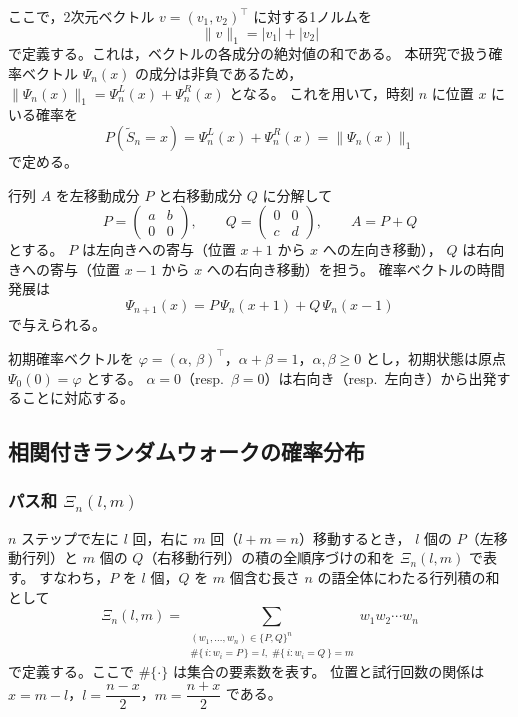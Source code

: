 \documentclass[a4j,dvipdfmx]{jsarticle}
\theoremstyle{plainnote}
\begin{document}
ここで，2次元ベクトル $v = (v_1, v_2)^\top$ に対する1ノルムを
\begin{equation}
  \|v\|_1 = |v_1| + |v_2|
  \label{eq:l1_norm}
\end{equation}
で定義する。これは，ベクトルの各成分の絶対値の和である。
本研究で扱う確率ベクトル $\Psi_n(x)$ の成分は非負であるため，
$\|\Psi_n(x)\|_1 = \Psi_n^L(x) + \Psi_n^R(x)$ となる。
これを用いて，時刻 $n$ に位置 $x$ にいる確率を
\[
  P(\tilde{S}_n = x) = \Psi_n^L(x) + \Psi_n^R(x) = \|\Psi_n(x)\|_1
\]
で定める。

行列 $A$ を左移動成分 $P$ と右移動成分 $Q$ に分解して
\[
  P = \begin{pmatrix} a & b \\ 0 & 0 \end{pmatrix}, \qquad
  Q = \begin{pmatrix} 0 & 0 \\ c & d \end{pmatrix}, \qquad
  A = P + Q
\]
とする。
$P$ は左向きへの寄与（位置 $x+1$ から $x$ への左向き移動），
$Q$ は右向きへの寄与（位置 $x-1$ から $x$ への右向き移動）を担う。
確率ベクトルの時間発展は
\begin{equation}
  \Psi_{n+1}(x) = P\,\Psi_n(x+1) + Q\,\Psi_n(x-1)
  \label{eq:crw_evolution}
\end{equation}
で与えられる。

初期確率ベクトルを
$\varphi = (\alpha,\,\beta)^\top$，$\alpha + \beta = 1$，$\alpha,\beta \geq 0$
とし，初期状態は原点 $\Psi_0(0) = \varphi$ とする。
$\alpha = 0$（resp.\ $\beta = 0$）は右向き（resp.\ 左向き）から出発することに対応する。

\subsection{相関付きランダムウォークの確率分布}

\subsubsection*{パス和 $\Xi_n(l,m)$}

$n$ ステップで左に $l$ 回，右に $m$ 回（$l + m = n$）移動するとき，
$l$ 個の $P$（左移動行列）と $m$ 個の $Q$（右移動行列）の積の全順序づけの和を
$\Xi_n(l, m)$ で表す。
すなわち，$P$ を $l$ 個，$Q$ を $m$ 個含む長さ $n$ の語全体にわたる行列積の和として
\begin{equation}
  \Xi_n(l, m)
  = \sum_{\substack{(w_1,\ldots,w_n)\in\{P,Q\}^n \\
        \#\{\,i : w_i = P\,\}=l,\;\#\{\,i : w_i = Q\,\}=m}}
    w_1 w_2 \cdots w_n
  \label{eq:path_sum}
\end{equation}
で定義する。ここで $\#\{\cdot\}$ は集合の要素数を表す。
位置と試行回数の関係は $x = m - l$，$l = \dfrac{n-x}{2}$，$m = \dfrac{n+x}{2}$ である。
\end{document}
